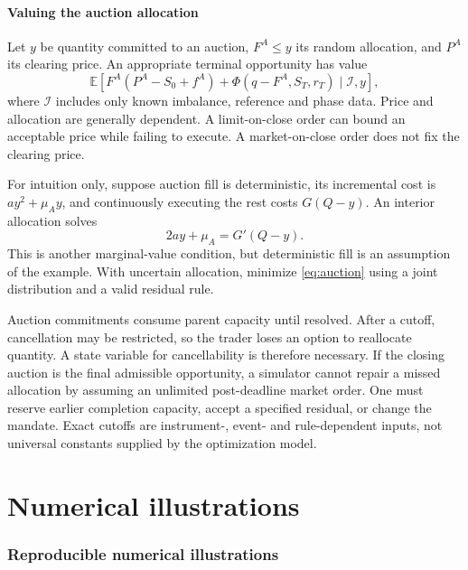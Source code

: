 \documentclass[11pt]{article}
\numberwithin{equation}{section}
\theoremstyle{definition}
\theoremstyle{remark}
\newcommand{\E}{\mathbb{E}}
\theoremstyle{definition}
\begin{document}
\subsection{Valuing the auction allocation}

Let $y$ be quantity committed to an auction, $F^A\leq y$ its random allocation,
and $P^A$ its clearing price. An appropriate terminal opportunity has value
\begin{equation}\label{eq:auction}
 \E\left[F^A(P^A-S_0+f^A)
          +\Phi(q-F^A,S_T,r_T)\mid \mathcal I, y\right],
\end{equation}
where $\mathcal I$ includes only known imbalance, reference and phase data.
Price and allocation are generally dependent. A limit-on-close order can
bound an acceptable price while failing to execute. A market-on-close order
does not fix the clearing price.

For intuition only, suppose auction fill is deterministic, its incremental
cost is $ay^2+\mu_Ay$, and continuously executing the rest costs $G(Q-y)$.
An interior allocation solves
\begin{equation}\label{eq:auctionmarginal}
 2ay+\mu_A=G'(Q-y).
\end{equation}
This is another marginal-value condition, but deterministic fill is an
assumption of the example. With uncertain allocation, minimize
\eqref{eq:auction} using a joint distribution and a valid residual rule.

Auction commitments consume parent capacity until resolved. After a cutoff,
cancellation may be restricted, so the trader loses an option to reallocate
quantity. A state variable for cancellability is therefore necessary. If the
closing auction is the final admissible opportunity, a simulator cannot repair
a missed allocation by assuming an unlimited post-deadline market order.
One must reserve earlier completion capacity, accept a specified residual,
or change the mandate. Exact cutoffs are instrument-, event- and rule-dependent
inputs, not universal constants supplied by the optimization model.

\part{Numerical illustrations}\label{pt:experiments}
\section{Reproducible numerical illustrations}\label{sec:experiments}
\end{document}
